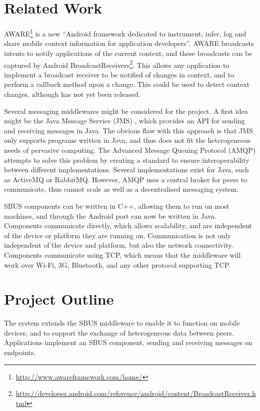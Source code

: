 \documentclass[12pt,twoside,notitlepage]{report}
\begin{document}
\section{Related Work}

AWARE\footnote{\url{http://www.awareframework.com/home/}} is a new ``Android framework dedicated to instrument, infer, log and share mobile context information for application developers''. 
AWARE broadcasts intents to notify applications of the current context, and these broadcasts can be captured by Android BroadcastReceivers\footnote{\url{http://developer.android.com/reference/android/content/BroadcastReceiver.html}}. 
This allows any application to implement a broadcast receiver to be notified of changes in context, and to perform a callback method upon a change. 
This could be used to detect context changes, although has not yet been released. 

Several messaging middlewares might be considered for the project. 
A first idea might be the Java Message Service (JMS) \cite{hapner2002java}, which provides an API for sending and receiving messages in Java. 
The obvious flaw with this approach is that JMS only supports programs written in Java, and thus does not fit the heterogeneous needs of pervasive computing. 
The Advanced Message Queuing Protocol (AMQP) \cite{vinoski2006advanced} attempts to solve this problem by creating a standard to ensure interoperability between different implementations. 
Several implementations exist for Java, such as ActiveMQ or RabbitMQ. 
However, AMQP uses a central broker for peers to communicate, thus cannot scale as well as a decentralised messaging system. 

SBUS components can be written in C++, allowing them to run on most machines, and through the Android port can now be written in Java. 
Components communicate directly, which allows scalability, and are independent of the device or platform they are running on. 
Communication is not only independent of the device and platform, but also the network connectivity. 
Components communicate using TCP, which means that the middleware will work over Wi-Fi, 3G, Bluetooth, and any other protocol supporting TCP. 

\section{Project Outline}

The system extends the SBUS middleware to enable it to function on mobile devices, and to support the exchange of heterogeneous data between peers. 
Applications implement an SBUS component, sending and receiving messages on endpoints. 
\end{document}
